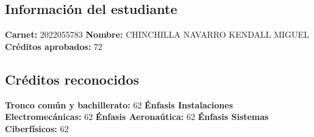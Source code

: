 \documentclass[letterpaper]{article}%
\begin{document}
%
\normalsize%
\subsection*{Información del estudiante}%
\label{subsec:Informacindelestudiante}%
\textbf{Carnet: }%
2022055783%
\newline%
\textbf{Nombre: }%
CHINCHILLA NAVARRO KENDALL MIGUEL%
\newline%
\textbf{Créditos aprobados: }%
72

%
\subsection*{Créditos reconocidos}%
\label{subsec:Crditosreconocidos}%
\textbf{Tronco común y bachillerato: }%
62%
\newline%
\textbf{Énfasis Instalaciones Electromecánicas: }%
62%
\newline%
\textbf{Énfasis Aeronaútica: }%
62%
\newline%
\textbf{Énfasis Sistemas Ciberfísicos: }%
62

%
\end{document}
